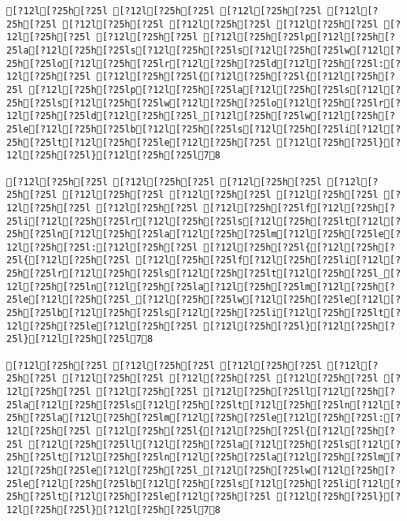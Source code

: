 \documentclass{scrartcl}
\begin{document}
\begin{Verbatim}
[?12l[?25h[?25l [?12l[?25h[?25l [?12l[?25h[?25l [?12l[?25h[?25l [?12l[?25h[?25l [?12l[?25h[?25l [?12l[?25h[?25l [?12l[?25h[?25l [?12l[?25h[?25l [?12l[?25h[?25lp[?12l[?25h[?25la[?12l[?25h[?25ls[?12l[?25h[?25ls[?12l[?25h[?25lw[?12l[?25h[?25lo[?12l[?25h[?25lr[?12l[?25h[?25ld[?12l[?25h[?25l:[?12l[?25h[?25l [?12l[?25h[?25l{[?12l[?25h[?25l{[?12l[?25h[?25l [?12l[?25h[?25lp[?12l[?25h[?25la[?12l[?25h[?25ls[?12l[?25h[?25ls[?12l[?25h[?25lw[?12l[?25h[?25lo[?12l[?25h[?25lr[?12l[?25h[?25ld[?12l[?25h[?25l_[?12l[?25h[?25lw[?12l[?25h[?25le[?12l[?25h[?25lb[?12l[?25h[?25ls[?12l[?25h[?25li[?12l[?25h[?25lt[?12l[?25h[?25le[?12l[?25h[?25l [?12l[?25h[?25l}[?12l[?25h[?25l}[?12l[?25h[?25l78

[?12l[?25h[?25l [?12l[?25h[?25l [?12l[?25h[?25l [?12l[?25h[?25l [?12l[?25h[?25l [?12l[?25h[?25l [?12l[?25h[?25l [?12l[?25h[?25l [?12l[?25h[?25l [?12l[?25h[?25lf[?12l[?25h[?25li[?12l[?25h[?25lr[?12l[?25h[?25ls[?12l[?25h[?25lt[?12l[?25h[?25ln[?12l[?25h[?25la[?12l[?25h[?25lm[?12l[?25h[?25le[?12l[?25h[?25l:[?12l[?25h[?25l [?12l[?25h[?25l{[?12l[?25h[?25l{[?12l[?25h[?25l [?12l[?25h[?25lf[?12l[?25h[?25li[?12l[?25h[?25lr[?12l[?25h[?25ls[?12l[?25h[?25lt[?12l[?25h[?25l_[?12l[?25h[?25ln[?12l[?25h[?25la[?12l[?25h[?25lm[?12l[?25h[?25le[?12l[?25h[?25l_[?12l[?25h[?25lw[?12l[?25h[?25le[?12l[?25h[?25lb[?12l[?25h[?25ls[?12l[?25h[?25li[?12l[?25h[?25lt[?12l[?25h[?25le[?12l[?25h[?25l [?12l[?25h[?25l}[?12l[?25h[?25l}[?12l[?25h[?25l78

[?12l[?25h[?25l [?12l[?25h[?25l [?12l[?25h[?25l [?12l[?25h[?25l [?12l[?25h[?25l [?12l[?25h[?25l [?12l[?25h[?25l [?12l[?25h[?25l [?12l[?25h[?25l [?12l[?25h[?25ll[?12l[?25h[?25la[?12l[?25h[?25ls[?12l[?25h[?25lt[?12l[?25h[?25ln[?12l[?25h[?25la[?12l[?25h[?25lm[?12l[?25h[?25le[?12l[?25h[?25l:[?12l[?25h[?25l [?12l[?25h[?25l{[?12l[?25h[?25l{[?12l[?25h[?25l [?12l[?25h[?25ll[?12l[?25h[?25la[?12l[?25h[?25ls[?12l[?25h[?25lt[?12l[?25h[?25ln[?12l[?25h[?25la[?12l[?25h[?25lm[?12l[?25h[?25le[?12l[?25h[?25l_[?12l[?25h[?25lw[?12l[?25h[?25le[?12l[?25h[?25lb[?12l[?25h[?25ls[?12l[?25h[?25li[?12l[?25h[?25lt[?12l[?25h[?25le[?12l[?25h[?25l [?12l[?25h[?25l}[?12l[?25h[?25l}[?12l[?25h[?25l78


\end{Verbatim}
\end{document}
